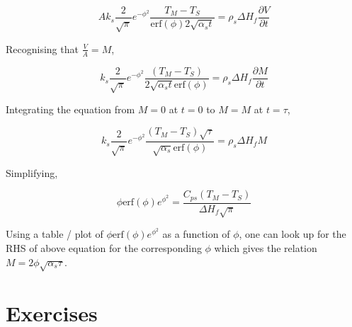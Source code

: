 $$
A k_s \frac{2}{\sqrt{\pi}} e^{-\phi^2} \frac {T_M-T_S}{ \text{erf}(\phi) 2
\sqrt{\alpha_s t} } = \rho_s \Delta H_f \frac{\partial V}{\partial t}
$$

Recognising that $\frac{V}{A} = M$,

$$
k_s \frac{2}{\sqrt{\pi}} e^{-\phi^2} \frac {(T_M-T_S)}{2 \sqrt{\alpha_s t}
\text{erf}(\phi) } = \rho_s \Delta H_f \frac{\partial M}{\partial t}
$$

Integrating the equation from $M=0$ at $t=0$ to $M=M$ at $t=\tau$,

$$
 k_s \frac{2}{\sqrt{\pi}} e^{-\phi^2} \frac {(T_M-T_S)
\sqrt{\tau}}{\sqrt{\alpha_s} \text{erf}(\phi) } = \rho_s \Delta H_f M
$$

Simplifying,

$$
\boxed{
\phi \text{erf}(\phi) e^{\phi^2}  = \frac{C_{ps}(T_M-T_S)}{\Delta H_f
\sqrt{\pi}} 
}
$$

Using a table / plot of $\phi \text{erf}(\phi) e^{\phi^2}$ as a function of
$\phi$, one can look up for the RHS of above equation for the corresponding
$\phi$ which gives the relation $M = 2 \phi \sqrt{\alpha_s \tau}$.

\pagebreak
\section{Exercises}

